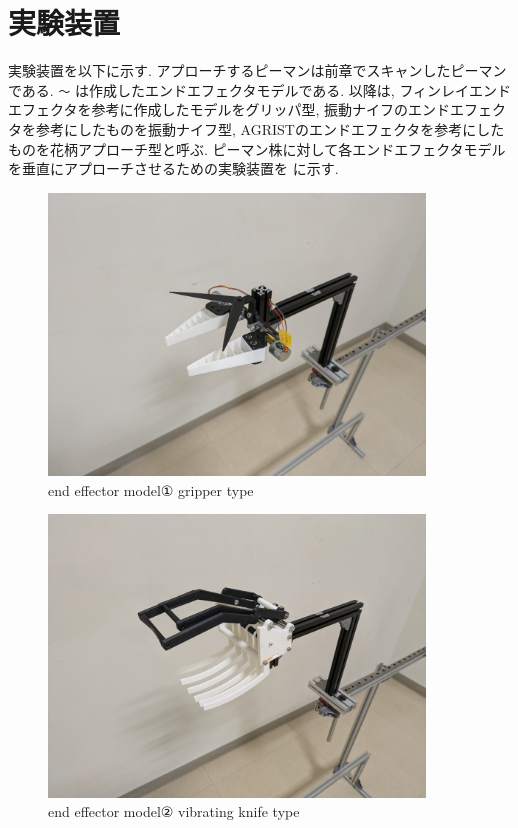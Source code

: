 \section{実験装置}
実験装置を以下に示す.
アプローチするピーマンは前章でスキャンしたピーマンである.
 \verb|〜|  は作成したエンドエフェクタモデルである.
以降は, フィンレイエンドエフェクタを参考に作成したモデルをグリッパ型, 振動ナイフのエンドエフェクタを参考にしたものを振動ナイフ型, AGRISTのエンドエフェクタを参考にしたものを花柄アプローチ型と呼ぶ.
ピーマン株に対して各エンドエフェクタモデルを垂直にアプローチさせるための実験装置を  に示す.


\vspace{5mm}
\begin{figure}[H]
     \centering
     \includegraphics[width=100mm]{images/png/finray_model.png}
     \caption{end effector model① gripper type}
     \label{Fig:finraymodel}
   \end{figure}

\begin{figure}[H]
    \centering
    \includegraphics[width=100mm]{images/png/sweeper_model.png}
    \caption{end effector model② vibrating knife type}
    \label{Fig:sweepermodel}
   \end{figure}

